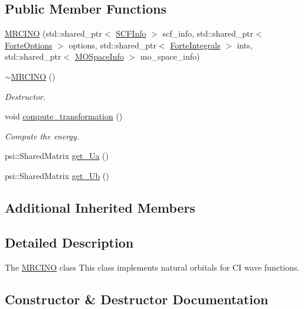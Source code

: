 \subsection*{Public Member Functions}
\begin{DoxyCompactItemize}
\item 
\mbox{\hyperlink{classforte_1_1_m_r_c_i_n_o_a105892a5f7d68e805eca8711337b7c11}{M\+R\+C\+I\+NO}} (std\+::shared\+\_\+ptr$<$ \mbox{\hyperlink{classforte_1_1_s_c_f_info}{S\+C\+F\+Info}} $>$ scf\+\_\+info, std\+::shared\+\_\+ptr$<$ \mbox{\hyperlink{classforte_1_1_forte_options}{Forte\+Options}} $>$ options, std\+::shared\+\_\+ptr$<$ \mbox{\hyperlink{classforte_1_1_forte_integrals}{Forte\+Integrals}} $>$ ints, std\+::shared\+\_\+ptr$<$ \mbox{\hyperlink{classforte_1_1_m_o_space_info}{M\+O\+Space\+Info}} $>$ mo\+\_\+space\+\_\+info)
\item 
\mbox{\hyperlink{classforte_1_1_m_r_c_i_n_o_a164cef53988921f9c4bec1da4a46b5d9}{$\sim$\+M\+R\+C\+I\+NO}} ()
\begin{DoxyCompactList}\small\item\em Destructor. \end{DoxyCompactList}\item 
void \mbox{\hyperlink{classforte_1_1_m_r_c_i_n_o_a0011f9c5bf52e26c96c3283beca3355a}{compute\+\_\+transformation}} ()
\begin{DoxyCompactList}\small\item\em Compute the energy. \end{DoxyCompactList}\item 
psi\+::\+Shared\+Matrix \mbox{\hyperlink{classforte_1_1_m_r_c_i_n_o_a75ca07096273157f61dc00db296944ee}{get\+\_\+\+Ua}} ()
\item 
psi\+::\+Shared\+Matrix \mbox{\hyperlink{classforte_1_1_m_r_c_i_n_o_a1a729beebcee99c34d9baa50af547d6e}{get\+\_\+\+Ub}} ()
\end{DoxyCompactItemize}
\subsection*{Additional Inherited Members}


\subsection{Detailed Description}
The \mbox{\hyperlink{classforte_1_1_m_r_c_i_n_o}{M\+R\+C\+I\+NO}} class This class implements natural orbitals for CI wave functions. 

\subsection{Constructor \& Destructor Documentation}
\mbox{\label{classforte_1_1_m_r_c_i_n_o_a105892a5f7d68e805eca8711337b7c11}} 
